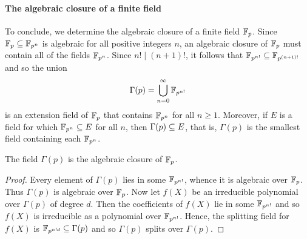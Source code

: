\paragraph{The algebraic closure of a finite field}
To conclude, we determine the algebraic closure of a finite field $\mathbb{F}_{p}$. Since $\mathbb{F}_{p}\subseteq\mathbb{F}_{p^n}$ is algebraic for all positive integers $n$, an algebraic closure of $\mathbb{F}_p$ must contain all of the fields $\mathbb{F}_{p^n}$. Since $n!\mid(n+1)!$, it follows that $\mathbb{F}_{p^{n!}}\subseteq\mathbb{F}_{p^{(n+1)!}}$ and so the union
\[\Gamma(p)=\bigcup_{n=0}^{\infty}\mathbb{F}_{p^{n!}}\]
is an extension field of $\mathbb{F}_p$ that contains $\mathbb{F}_{p^n}$ for all $n\geq 1$. Moreover, if $E$ is a field for which $\mathbb{F}_{p^n}\subseteq E$ for all $n$, then $\Gamma(p)\subseteq E$, that is, $\Gamma(p)$ is the smallest field containing each $\mathbb{F}_{p^n}$.
\begin{theorem}
The field $\Gamma(p)$ is the algebraic closure of $\mathbb{F}_p$.
\end{theorem}
\begin{proof}
Every element of $\Gamma(p)$ lies in some $\mathbb{F}_{p^{n!}}$, whence it is algebraic over $\mathbb{F}_p$. Thus $\Gamma(p)$ is algebraic over $\mathbb{F}_p$. Now let $f(X)$ be an irreducible polynomial over $\Gamma(p)$ of degree $d$. Then the coefficients of $f(X)$ lie in some $\mathbb{F}_{p^{n!}}$ and so $f(X)$ is irreducible as a polynomial over $\mathbb{F}_{p^{n!}}$. Hence, the splitting field for $f(X)$ is $\mathbb{F}_{p^{n!d}}\subseteq\Gamma(p)$ and so $\Gamma(p)$ splits over $\Gamma(p)$.
\end{proof}
